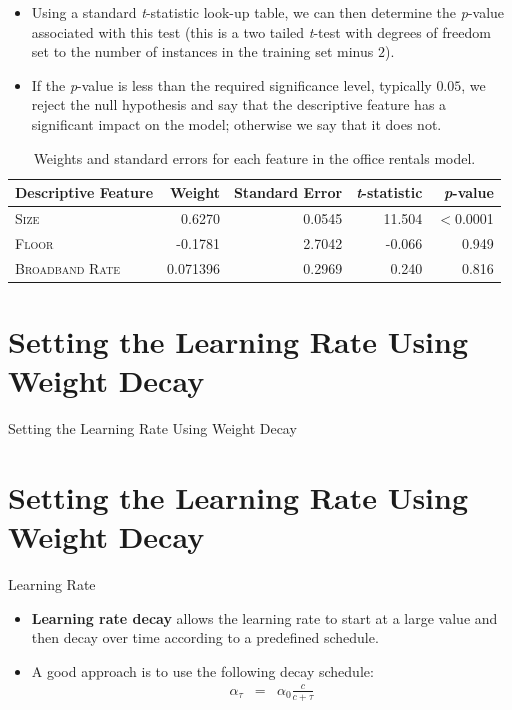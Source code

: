\documentclass[xcolor={table}]{beamer}
\newcommand{\SectionSlideShortHeader}[3][]{
	\ifthenelse{\isempty{#1}}
		{\section[#3]{#2}\begin{frame} \begin{center}\begin{huge}#2\end{huge}\end{center}\end{frame}}
		{\section[#1]{#2}\begin{frame} \begin{center}\begin{huge}#3\end{huge}\end{center}\end{frame}}
}
\newcommand{\keyword}[1]{\alert{\textbf{#1}}\index{#1}}
\newcommand{\featN}[1]{\textsc{#1}}
\begin{document}
\begin{frame}
\begin{itemize}
\item Using a standard \textit{t}-statistic look-up table, we can then determine the \textit{p}-value associated with this test (this is a two tailed \textit{t}-test with degrees of freedom set to the number of instances in the training set minus $2$). 
\item If the \textit{p}-value is less than the required significance level, typically $0.05$, we reject the null hypothesis and say that the descriptive feature has a significant impact on the model; otherwise we say that it does not. 
\end{itemize}
\begin{table}[!hbt]
	\caption{Weights and standard errors for each feature in the office rentals model.}
	\centering
	\begin{footnotesize}
	\begin{tabular}{ l r r r r }
		\hline
		Descriptive Feature & Weight & Standard Error & \textit{t}-statistic & \textit{p}-value \\
		\hline
		\featN{Size} & 0.6270	&	0.0545	&	11.504	& $<$0.0001	\\
		\featN{Floor} & -0.1781	&	2.7042		& -0.066	& 0.949	\\
		\featN{Broadband Rate} &	0.071396	& 0.2969	& 0.240	& 0.816	\\
		\hline
	\end{tabular}
	\end{footnotesize}
\label{tab:modelEffectsOfficeRentals}
\end{table}
\end{frame} 


\SectionSlideShortHeader{Setting the Learning Rate Using Weight Decay}{Learning Rate}



 \begin{frame} 
 \begin{itemize}
 \item \keyword{Learning rate decay} allows the learning rate to start at a large value and then decay over time according to a predefined schedule. 
 \item A good approach is to use the following decay schedule:
\begin{eqnarray}
	\alpha_\tau & = & \alpha_0\frac{c}{c + \tau}
	\label{eqn:learningRateDecay}
\end{eqnarray}
\end{itemize}
\end{frame} 
\end{document}
